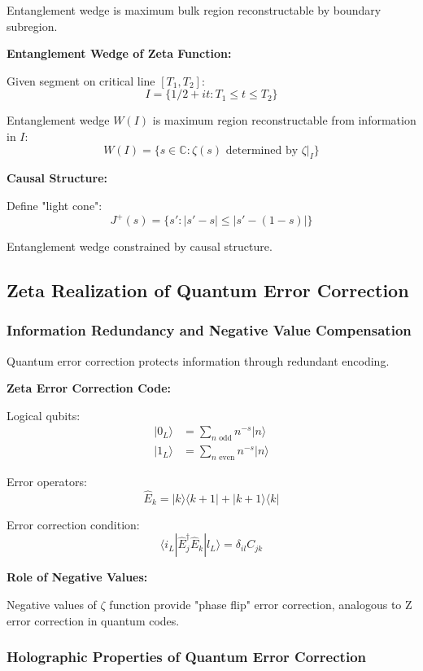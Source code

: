 \documentclass[11pt]{article}
\theoremstyle{plain}
\theoremstyle{definition}
\theoremstyle{remark}
\begin{document}
Entanglement wedge is maximum bulk region reconstructable by boundary subregion.

\textbf{Entanglement Wedge of Zeta Function:}

Given segment on critical line $[T_1, T_2]$:
$$I = \{1/2 + it: T_1 \leq t \leq T_2\}$$

Entanglement wedge $W(I)$ is maximum region reconstructable from information in $I$:
$$W(I) = \{s \in \mathbb{C}: \zeta(s) \text{ determined by } \zeta|_I\}$$

\textbf{Causal Structure:}

Define "light cone":
$$J^+(s) = \{s': |s' - s| \leq |s' - (1-s)|\}$$

Entanglement wedge constrained by causal structure.

\subsection{Zeta Realization of Quantum Error Correction}

\subsubsection{Information Redundancy and Negative Value Compensation}

Quantum error correction protects information through redundant encoding.

\textbf{Zeta Error Correction Code:}

Logical qubits:
\begin{align}
|0_L\rangle &= \sum_{n \text{ odd}} n^{-s} |n\rangle \\
|1_L\rangle &= \sum_{n \text{ even}} n^{-s} |n\rangle
\end{align}

Error operators:
$$\hat{E}_k = |k\rangle\langle k+1| + |k+1\rangle\langle k|$$

Error correction condition:
$$\langle i_L | \hat{E}_j^\dagger \hat{E}_k | l_L \rangle = \delta_{il} C_{jk}$$

\textbf{Role of Negative Values:}

Negative values of $\zeta$ function provide "phase flip" error correction, analogous to Z error correction in quantum codes.

\subsubsection{Holographic Properties of Quantum Error Correction}
\end{document}
